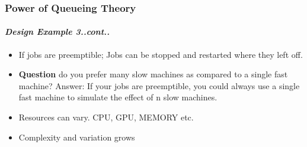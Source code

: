 \documentclass{beamer}
\begin{document}
\begin{frame}
    \frametitle{Power of Queueing Theory}
    \framesubtitle{\textbf{\textit{Design Example 3..cont..}}}
	\begin{itemize}
		\item If jobs are preemptible; Jobs can be stopped and restarted where they left off. 
		\item \textbf{Question} do you prefer many slow machines as compared to a single fast 					machine? 
		Answer: If your jobs are preemptible, you could always use a single fast 										machine to simulate the effect of n slow machines.  
		\item Resources can vary. CPU, GPU, MEMORY etc. 
		\item Complexity and variation grows
			
	\end{itemize}	    
    
\end{frame}
\end{document}
